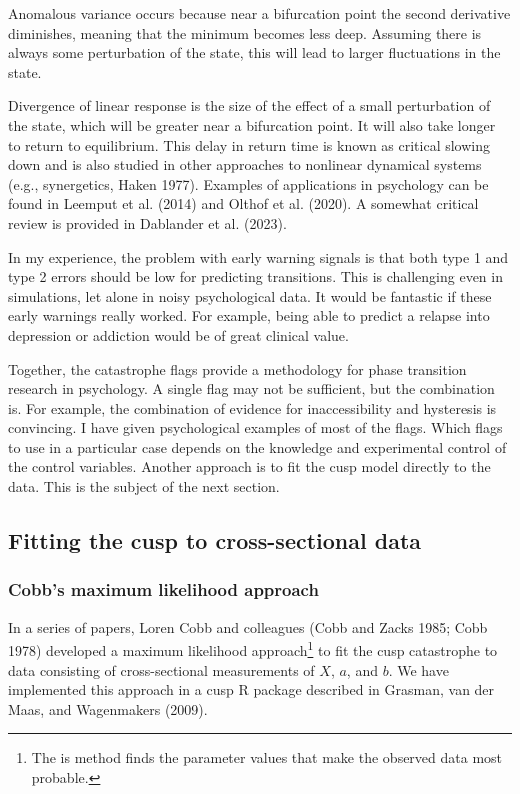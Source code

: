 \documentclass[
  a4paper,
  DIV=11,
  numbers=noendperiod,
  oneside]{scrreprt}
\begin{document}
Anomalous variance occurs because near a bifurcation point the second
derivative diminishes, meaning that the minimum becomes less deep.
Assuming there is always some perturbation of the state, this will lead
to larger fluctuations in the state.

Divergence of linear response is the size of the effect of a small
perturbation of the state, which will be greater near a bifurcation
point. It will also take longer to return to equilibrium. This delay in
return time is known as critical slowing down and is also studied in
other approaches to nonlinear dynamical systems (e.g., synergetics,
Haken 1977). Examples of applications in psychology can be found in
Leemput et al. (2014) and Olthof et al. (2020). A somewhat critical
review is provided in Dablander et al. (2023).

In my experience, the problem with early warning signals is that both
type 1 and type 2 errors should be low for predicting transitions. This
is challenging even in simulations, let alone in noisy psychological
data. It would be fantastic if these early warnings really worked. For
example, being able to predict a relapse into depression or addiction
would be of great clinical value.

Together, the catastrophe flags provide a methodology for phase
transition research in psychology. A single flag may not be sufficient,
but the combination is. For example, the combination of evidence for
inaccessibility and hysteresis is convincing. I have given psychological
examples of most of the flags. Which flags to use in a particular case
depends on the knowledge and experimental control of the control
variables. Another approach is to fit the cusp model directly to the
data. This is the subject of the next section.

\subsection{Fitting the cusp to cross-sectional
data}\label{sec-Fitting-the-cusp-to-crosssectional-data}

\subsubsection{Cobb's maximum likelihood
approach}\label{sec-Cobbs-maximum-likelihood-approach}

In a series of papers, Loren Cobb and colleagues (Cobb and Zacks 1985;
Cobb 1978) developed a maximum likelihood approach\footnote{The is
  method finds the parameter values that make the observed data most
  probable.} to fit the cusp catastrophe to data consisting of
cross-sectional measurements of \(X\), \(a\), and \(b\). We have
implemented this approach in a cusp R package described in Grasman, van
der Maas, and Wagenmakers (2009).
\end{document}
